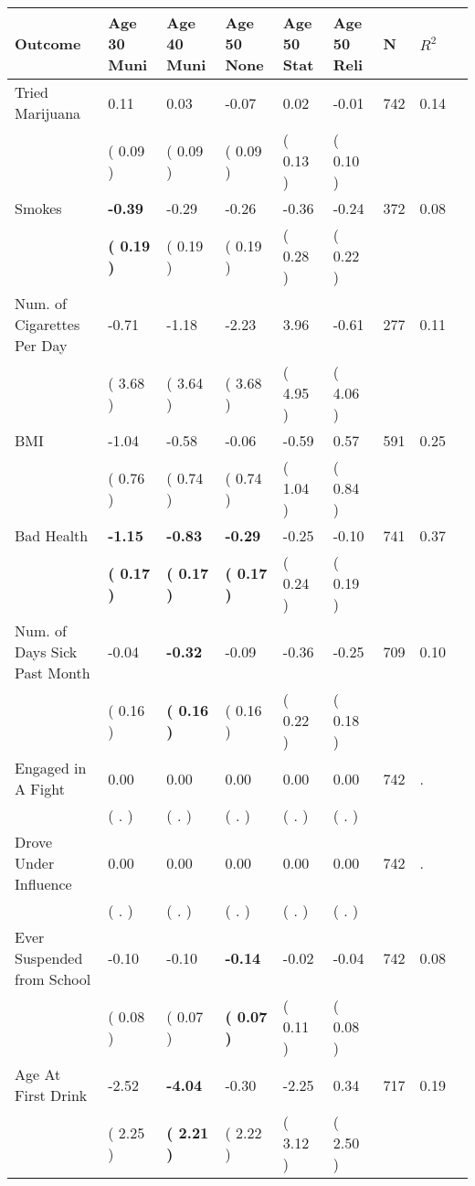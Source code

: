 \begin{tabular}{L{6.2cm} C{1.8cm} C{1.8cm} C{1.8cm} C{1.8cm} C{1.8cm} C{1.8cm} C{0.3cm} C{0.3cm}}
\toprule
 \textbf{Outcome} & \textbf{Age 30 Muni} & \textbf{Age 40 Muni} & \textbf{Age 50 None} & \textbf{Age 50 Stat} & \textbf{Age 50 Reli} & \textbf{N} & \textbf{$ R^2$} \\
\midrule
Tried Marijuana &      0.11 &      0.03 &     -0.07 &      0.02 &     -0.01  & 742 &       0.14 \\ 
 & (     0.09 ) & (     0.09 ) & (     0.09 ) & (     0.13 ) & (     0.10 )  & \\
Smokes & \textbf{    -0.39} &     -0.29 &     -0.26 &     -0.36 &     -0.24  & 372 &       0.08 \\ 
 & \textbf{(     0.19 )} & (     0.19 ) & (     0.19 ) & (     0.28 ) & (     0.22 )  & \\
Num. of Cigarettes Per Day &     -0.71 &     -1.18 &     -2.23 &      3.96 &     -0.61  & 277 &       0.11 \\ 
 & (     3.68 ) & (     3.64 ) & (     3.68 ) & (     4.95 ) & (     4.06 )  & \\
BMI &     -1.04 &     -0.58 &     -0.06 &     -0.59 &      0.57  & 591 &       0.25 \\ 
 & (     0.76 ) & (     0.74 ) & (     0.74 ) & (     1.04 ) & (     0.84 )  & \\
Bad Health & \textbf{    -1.15} & \textbf{    -0.83} & \textbf{    -0.29} &     -0.25 &     -0.10  & 741 &       0.37 \\ 
 & \textbf{(     0.17 )} & \textbf{(     0.17 )} & \textbf{(     0.17 )} & (     0.24 ) & (     0.19 )  & \\
Num. of Days Sick Past Month &     -0.04 & \textbf{    -0.32} &     -0.09 &     -0.36 &     -0.25  & 709 &       0.10 \\ 
 & (     0.16 ) & \textbf{(     0.16 )} & (     0.16 ) & (     0.22 ) & (     0.18 )  & \\
Engaged in A Fight &      0.00 &      0.00 &      0.00 &      0.00 &      0.00  & 742 &          . \\ 
 & (        . ) & (        . ) & (        . ) & (        . ) & (        . )  & \\
Drove Under Influence &      0.00 &      0.00 &      0.00 &      0.00 &      0.00  & 742 &          . \\ 
 & (        . ) & (        . ) & (        . ) & (        . ) & (        . )  & \\
Ever Suspended from School &     -0.10 &     -0.10 & \textbf{    -0.14} &     -0.02 &     -0.04  & 742 &       0.08 \\ 
 & (     0.08 ) & (     0.07 ) & \textbf{(     0.07 )} & (     0.11 ) & (     0.08 )  & \\
Age At First Drink &     -2.52 & \textbf{    -4.04} &     -0.30 &     -2.25 &      0.34  & 717 &       0.19 \\ 
 & (     2.25 ) & \textbf{(     2.21 )} & (     2.22 ) & (     3.12 ) & (     2.50 )  & \\
\bottomrule
\end{tabular}
